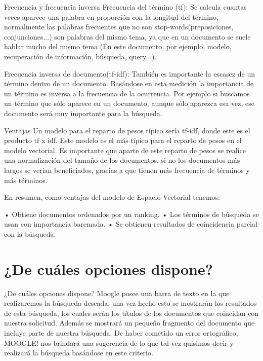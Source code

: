 \documentclass[aspectratio = 169]{beamer}
\begin{document}
\begin{frame}{Frecuencia y frecuencia inversa}
\justifying
Frecuencia del término (tf): Se calcula cuantas veces aparece una palabra en proporción con la longitud del término, normalmente las palabras frecuentes que no son stop-words(preposiciones, conjunciones...) son palabras del mismo tema, ya que en un documento se suele hablar mucho del mismo tema (En este documento, por ejemplo, modelo, recuperación de información, búsqueda, query...).

Frecuencia inversa de documento(tf-idf): También es importante la escasez de un término dentro de un documento. Basándose en esta medición la importancia de un término es inversa a la frecuencia de la ocurrencia. Por ejemplo si buscamos un término que sólo aparece en un documento, aunque sólo aparezca esa vez, ese documento será muy importante para la búsqueda.
\end{frame}

\begin{frame}{Ventajas}
\justifying
Un modelo para el reparto de pesos típico sería tf-idf, donde este es el producto tf x idf. Este modelo es el más típico para el reparto de pesos en el modelo vectorial. Es importante que aparte de este reparto de pesos se realice una normalización del tamaño de los documentos, si no los documentos más largos se verían beneficiados, gracias a que tienen más frecuencia de términos y más términos.

En resumen, como ventajas del modelo de Espacio Vectorial tenemos:

• Obtiene documentos ordenados por un ranking.\newline
• Los términos de búsqueda se usan con importancia baremada.\newline
• Se obtienen resultados de coincidencia parcial con la búsqueda.
\end{frame}
\section{¿De cuáles opciones dispone?}
\begin{frame}{¿De cuáles opciones dispone?}
\justifying
Moogle posee una barra de texto en la que realizaremos la búsqueda deseada, una vez hecho esto se mostrarán los resultados de esta búsqueda, los cuales serán los títulos de los documentos que coincidan con nuestra solicitud. Además se mostrará un pequeño fragmento del documento que incluye parte de nuestra búsqueda. De haber cometido un error ortográfico, MOOGLE! nos brindará una sugerencia de lo que tal vez quisimos decir y realizará la búsqueda basándose en este criterio.
\end{frame}
\end{document}
